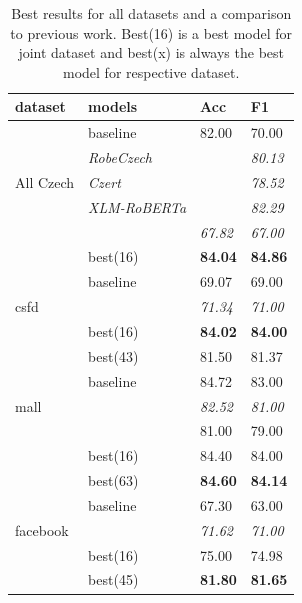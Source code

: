 \begin{table}[!h]
\centering
\begin{tabular}{|l|l||ll|}
\hline
dataset                    & models      & Acc   & F1    \\ \hline \hline
\multirow{5}{*}{All Czech} & baseline    & 82.00 & 70.00 \\ \cline{2-4} 
                           & \textit{RobeCzech }  &       & \textit{80.13} \\ \cline{2-4} 
                           & \textit{Czert}       &       & \textit{78.52} \\ \cline{2-4} 
                           & \textit{XLM-RoBERTa} &       & \textit{82.29} \\ \cline{2-4} 
                           & \textit{\citep{kysely}} & \textit{67.82} & \textit{67.00} \\ \cline{2-4}
                           & best(16)    & \textbf{84.04} & \textbf{84.86} \\ \hline \hline
\multirow{3}{*}{csfd}      & baseline    & 69.07 & 69.00 \\ \cline{2-4} 
& \textit{\citep{kysely}} & \textit{71.34} & \textit{71.00} \\ \cline{2-4}
                           & best(16)    & \textbf{84.02} & \textbf{84.00} \\ \cline{2-4} 
                           & best(43)    & 81.50 & 81.37 \\ \hline \hline
\multirow{3}{*}{mall}      & baseline    & 84.72 & 83.00 \\ \cline{2-4} 
& \textit{\citep{kysely}} & \textit{82.52} & \textit{81.00} \\ \cline{2-4}
& \textit{\citep{Klouda}} & 81.00 & 79.00 \\ \cline{2-4}
                           & best(16)    & 84.40 & 84.00 \\ \cline{2-4} 
                           & best(63)    & \textbf{84.60} & \textbf{84.14} \\ \hline \hline
\multirow{3}{*}{facebook}  & baseline    & 67.30 & 63.00 \\ \cline{2-4} 
& \textit{\citep{kysely}} & \textit{71.62} & \textit{71.00} \\ \cline{2-4}
                           & best(16)    & 75.00 & 74.98 \\ \cline{2-4} 
                           & best(45)    & \textbf{81.80} & \textbf{81.65} \\ \hline
\end{tabular}
\caption{Best results for all datasets and a comparison to previous work. Best(16) is a best model for joint dataset and best(x) is always the best model for respective dataset.}
\label{tab:res_sent_best}
\end{table}

